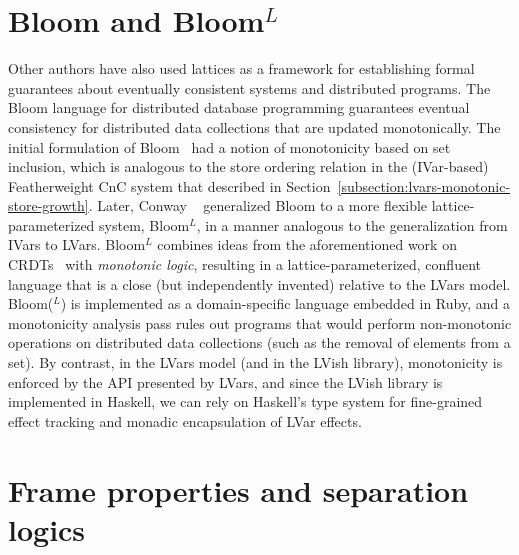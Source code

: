 \section{Bloom and Bloom$^L$}

Other authors have also used lattices as a framework for establishing
formal guarantees about eventually consistent systems and distributed
programs.  The Bloom language for distributed database programming
guarantees eventual consistency for distributed data collections that
are updated monotonically.  The initial formulation of
Bloom~\cite{bloom-cidr} had a notion of monotonicity based on set
inclusion, which is analogous to the store ordering relation in the
(IVar-based) Featherweight CnC system that  described in
Section~\ref{subsection:lvars-monotonic-store-growth}.  Later, Conway
\etal~ generalized Bloom to a more flexible
lattice-parameterized system, Bloom$^L$, in a manner analogous to the
generalization from IVars to LVars.  Bloom$^L$ combines ideas from the
aforementioned work on CRDTs~\cite{crdts, crdts-tr} with
\emph{monotonic logic}, resulting in a lattice-parameterized,
confluent language that is a close (but independently invented)
relative to the LVars model.  Bloom($^L$) is implemented as a
domain-specific language embedded in Ruby, and a monotonicity analysis
pass rules out programs that would perform non-monotonic operations on
distributed data collections (such as the removal of elements from a
set).  By contrast, in the LVars model (and in the LVish library),
monotonicity is enforced by the API presented by LVars, and since the
LVish library is implemented in Haskell, we can rely on Haskell's type
system for fine-grained effect tracking and monadic encapsulation of
LVar effects.

\section{Frame properties and separation logics}\label{s:related-frame-properties-and-separation-logics}

